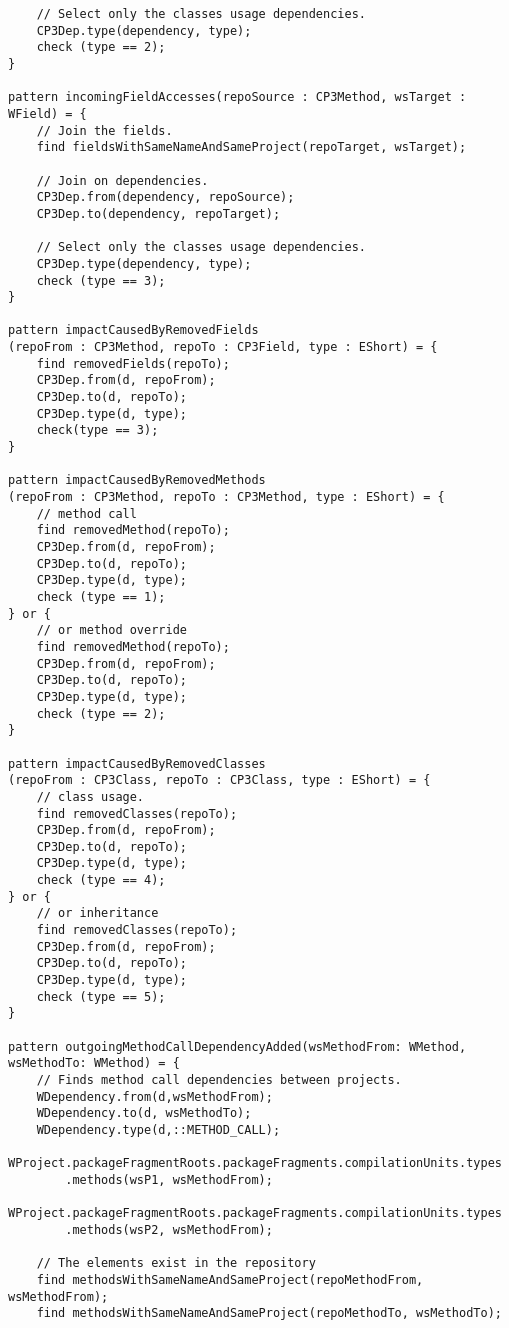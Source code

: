 \begin{lstlisting}
    // Select only the classes usage dependencies.
    CP3Dep.type(dependency, type);
    check (type == 2);
}

pattern incomingFieldAccesses(repoSource : CP3Method, wsTarget : WField) = {
    // Join the fields.
    find fieldsWithSameNameAndSameProject(repoTarget, wsTarget);

    // Join on dependencies.
    CP3Dep.from(dependency, repoSource);
    CP3Dep.to(dependency, repoTarget);

    // Select only the classes usage dependencies.
    CP3Dep.type(dependency, type);
    check (type == 3);
}

pattern impactCausedByRemovedFields
(repoFrom : CP3Method, repoTo : CP3Field, type : EShort) = {
    find removedFields(repoTo);
    CP3Dep.from(d, repoFrom);
    CP3Dep.to(d, repoTo);
    CP3Dep.type(d, type);
    check(type == 3);
}

pattern impactCausedByRemovedMethods
(repoFrom : CP3Method, repoTo : CP3Method, type : EShort) = {
    // method call
    find removedMethod(repoTo);
    CP3Dep.from(d, repoFrom);
    CP3Dep.to(d, repoTo);
    CP3Dep.type(d, type);
    check (type == 1);
} or {
    // or method override
    find removedMethod(repoTo);
    CP3Dep.from(d, repoFrom);
    CP3Dep.to(d, repoTo);
    CP3Dep.type(d, type);
    check (type == 2);
}

pattern impactCausedByRemovedClasses
(repoFrom : CP3Class, repoTo : CP3Class, type : EShort) = {
    // class usage.
    find removedClasses(repoTo);
    CP3Dep.from(d, repoFrom);
    CP3Dep.to(d, repoTo);
    CP3Dep.type(d, type);
    check (type == 4);
} or {
    // or inheritance
    find removedClasses(repoTo);
    CP3Dep.from(d, repoFrom);
    CP3Dep.to(d, repoTo);
    CP3Dep.type(d, type);
    check (type == 5);
}

pattern outgoingMethodCallDependencyAdded(wsMethodFrom: WMethod, wsMethodTo: WMethod) = {    
    // Finds method call dependencies between projects.
    WDependency.from(d,wsMethodFrom);
    WDependency.to(d, wsMethodTo);
    WDependency.type(d,::METHOD_CALL);
    WProject.packageFragmentRoots.packageFragments.compilationUnits.types
    	.methods(wsP1, wsMethodFrom);
    WProject.packageFragmentRoots.packageFragments.compilationUnits.types
    	.methods(wsP2, wsMethodFrom);
  
    // The elements exist in the repository
    find methodsWithSameNameAndSameProject(repoMethodFrom, wsMethodFrom);
    find methodsWithSameNameAndSameProject(repoMethodTo, wsMethodTo);
    

\end{lstlisting}
